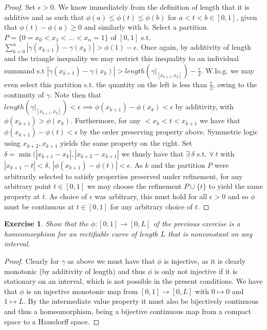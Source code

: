 \documentclass{article}
\newtheorem{exercise}{Exercise}
\begin{document}
  \begin{proof}
     Set $\epsilon>0$. We know immediately from the definition of length that it is additive and as such that $\phi(a) \leq \phi(t) \leq \phi(b)$ for $a < t < b \in [0,1]$, given that $\phi(t) - \phi(a) \geq 0$ and similarly with b. Select a partition $P= \{0 = x_{0} < x_{1} < ... < x_{n} = 1\}$ of $[0,1]$ s.t. $\sum_{k=0}^{n}|\gamma(x_{k+1}) - \gamma(x_{k})| > \phi(1) - \epsilon$. Once again, by additivity of length and the triangle inequality we may restrict this inequality to an individual summand s.t $|\gamma(x_{k+1}) - \gamma(x_{k})| > length(\gamma|_{[x_{k+1},x_{k}]}) - \frac{\epsilon}{2}$. W.lo.g. we may even select this partition s.t. the quantity on the left is less than $\frac{\epsilon}{2}$, owing to the continuity of $\gamma$. Note then that $length(\gamma|_{[x_{k+1},x_{k}]}) < \epsilon \implies \phi(x_{k+1}) - \phi(x_{k}) < \epsilon$ by additivity, with $\phi(x_{k+1}) > \phi(x_{k})$. Furthermore, for any $<x_{k}<t<x_{k+1}$ we have that $\phi(x_{k+1}) - \phi(t) < \epsilon$ by the order preserving property above. Symmetric logic using $x_{k+2},x_{k+1}$ yields the same property on the right. Set $\delta = \min(|x_{k+1}-x_{k}|, |x_{k+2}-x_{k+1}|$ we thusly have that $\exists \ \delta$ s.t. $\forall \ t$ with $|x_{k+1} - t| < \delta$, $|\phi(x_{k+1}) - \phi(t)| < \epsilon$. As $k$ and the partition $P$ were arbitrarily selected to satisfy properties preserved under refinement, for any arbitrary point $t \in [0,1]$ we may choose the refinement $P \cup \{t\}$ to yield the same property at $t$. As choice of $\epsilon$ was arbitrary, this must hold for all $\epsilon > 0$ and so $\phi$ must be continuous at $t \in [0,1]$ for any arbitrary choice of $t$. 
   \end{proof}

   \begin{exercise}
     Show that the $\phi: [0,1] \to [0,L]$ of the previous exercise is a homeomorphism for an rectifiable curve of length $L$ that is nonconstant on any interval.
   \end{exercise}
   \begin{proof}
     Clearly for $\gamma$ as above we must have that $\phi$ is injective, as it is clearly monotonic (by additivity of length) and thus $\phi$ is only not injective if it is stationary on an interval, which is not possible in the present conditions. We have that $\phi$ is an injective monotonic map from $[0,1]\to [0,L]$ with $0\mapsto 0$ and $1 \mapsto L$. By the intermediate value property it must also be bijectively continuous and thus a homeomorphism, being a bijective continuous map from a compact space to a Hausdorff space.   
   \end{proof}
\end{document}
